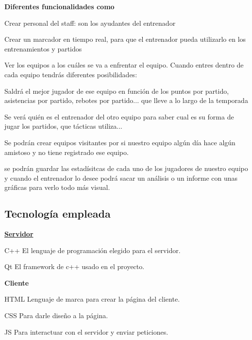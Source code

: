 {\bfseries Diferentes funcionalidades como}
\begin{DoxyItemize}
\item Crear personal del staff\+: son los ayudantes del entrenador
\item Crear un marcador en tiempo real, para que el entrenador pueda utilizarlo en los entrenamientos y partidos
\item Ver los equipos a los cuáles se va a enfrentar el equipo. Cuando entres dentro de cada equipo tendrás diferentes posibilidades\+:
\begin{DoxyEnumerate}
\item Saldrá el mejor jugador de ese equipo en función de los puntos por partido, asistencias por partido, rebotes por partido... que lleve a lo largo de la temporada
\item Se verá quién es el entrenador del otro equipo para saber cual es su forma de jugar los partidos, que tácticas utiliza...
\end{DoxyEnumerate}
\item Se podrán crear equipos visitantes por si nuestro equipo algún día hace algún amistoso y no tiene registrado ese equipo.
\item se podrán guardar las estadísitcas de cada uno de los jugadores de nuestro equipo y cuando el entrenador lo desee podrá sacar un análisis o un informe con unas gráficas para verlo todo más visual.
\end{DoxyItemize}

\subsection*{Tecnología empleada}

{\bfseries \mbox{\hyperlink{classServidor}{Servidor}}}
\begin{DoxyItemize}
\item C++ El lenguaje de programación elegido para el servidor.
\item Qt El framework de c++ usado en el proyecto.
\end{DoxyItemize}

{\bfseries Cliente}
\begin{DoxyItemize}
\item H\+T\+ML Lenguaje de marca para crear la página del cliente.
\item C\+SS Para darle diseño a la página.
\item JS Para interactuar con el servidor y enviar peticiones.
\end{DoxyItemize}

